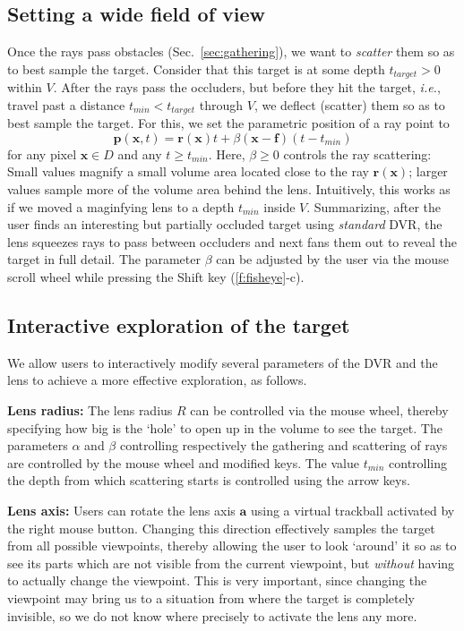 \subsection{Setting a wide field of view}
\label{sec:scattering}
%
Once the rays pass obstacles (Sec.~\ref{sec:gathering}), we want to \emph{scatter} them so as to best sample the target. Consider that this target is at some depth $t_{target}>0$ within $V$. After the rays pass the occluders, but before they hit the target, \emph{i.e.}, travel past a distance $t_{min} < t_{target}$ through $V$, we deflect (scatter) them so as to best sample the target. For this, we set the parametric position of a ray point to
%
\begin{equation}
\mathbf{p}(\mathbf{x}, t) = \mathbf{r}(\mathbf{x})t + \beta (\mathbf{x}-\mathbf{f})(t-t_{min})
\label{eqn:scattering}
\end{equation}
%
for any pixel $\mathbf{x} \in D$ and any $t \geq t_{min}$. Here, $\beta \geq 0$ controls the ray scattering: Small values magnify a small volume area located close to the ray $\mathbf{r}(\mathbf{x})$; larger values sample more of the volume area behind the lens. Intuitively, this works as if we moved a maginfying lens to a depth $t_{min}$ inside $V$. Summarizing, after the user finds an interesting but partially occluded target using \emph{standard} DVR, the lens squeezes rays to pass between occluders and next fans them out to reveal the target in full detail. The parameter $\beta$ can be adjusted by the user via the mouse scroll wheel while pressing the Shift key (\autoref{f:fisheye}-c).
%
%
\vspace{-0.15cm}
\subsection{Interactive exploration of the target}
%
We allow users to interactively modify several parameters of the DVR and the lens to achieve a more effective exploration, as follows.

\vspace{0.2cm}
\noindent\textbf{Lens radius:} The lens radius $R$ can be controlled via the mouse wheel, thereby specifying how big is the `hole' to open up in the volume to see the target. The parameters $\alpha$ and $\beta$ controlling respectively the gathering and scattering of rays are controlled by the mouse wheel and modified keys. The value $t_{min}$ controlling the depth from which scattering starts is controlled using the arrow keys.

\vspace{0.2cm}
\noindent\textbf{Lens axis:} Users can rotate the lens axis $\mathbf{a}$ using a virtual trackball activated by the right mouse button. Changing this direction effectively samples the target from all possible viewpoints, thereby allowing the user to look `around' it so as to see its parts which are not visible from the current viewpoint, but \emph{without} having to actually change the viewpoint. This is very important, since changing the viewpoint may bring us to a situation from where the target is completely invisible, so we do not know where precisely to activate the lens any more.

